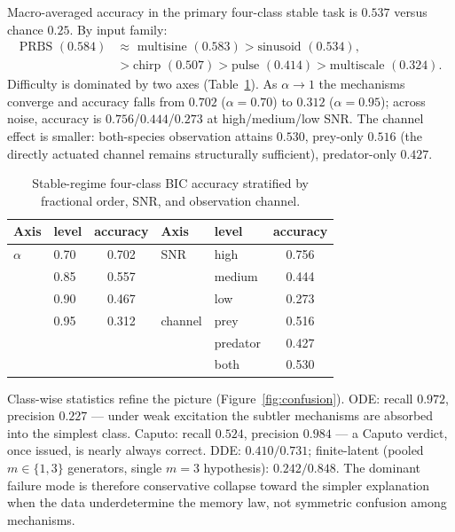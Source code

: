 Macro-averaged accuracy in the primary four-class stable task is $0.537$ versus chance $0.25$. By input family:
\[
\begin{aligned}
\text{PRBS }(0.584)&\approx\text{ multisine }(0.583)>\text{sinusoid }(0.534),\\
&>\text{chirp }(0.507)>\text{pulse }(0.414)>\text{multiscale }(0.324).
\end{aligned}
\]
Difficulty is dominated by two axes (Table~\ref{tab:benchmark-stratified}). As $\alpha\to1$ the mechanisms converge and accuracy falls from $0.702$ ($\alpha=0.70$) to $0.312$ ($\alpha=0.95$); across noise, accuracy is $0.756$/$0.444$/$0.273$ at high/medium/low SNR. The channel effect is smaller: both-species observation attains $0.530$, prey-only $0.516$ (the directly actuated channel remains structurally sufficient), predator-only $0.427$.

\begin{table}[htbp]
\centering
\caption{Stable-regime four-class BIC accuracy stratified by fractional order, SNR, and observation channel.}
\label{tab:benchmark-stratified}
\footnotesize
\setlength{\tabcolsep}{4pt}
\begin{tabular}{llc@{\quad}llc}
\hline
\textbf{Axis} & \textbf{level} & \textbf{accuracy} & \textbf{Axis} & \textbf{level} & \textbf{accuracy}\\
\hline
$\alpha$ & 0.70 & 0.702 & SNR & high & 0.756\\
          & 0.85 & 0.557 &     & medium & 0.444\\
          & 0.90 & 0.467 &     & low & 0.273\\
          & 0.95 & 0.312 & channel & prey & 0.516\\
          &      &       &         & predator & 0.427\\
          &      &       &         & both & 0.530\\
\hline
\end{tabular}
\end{table}

Class-wise statistics refine the picture (Figure~\ref{fig:confusion}). ODE: recall $0.972$, precision $0.227$ --- under weak excitation the subtler mechanisms are absorbed into the simplest class. Caputo: recall $0.524$, precision $0.984$ --- a Caputo verdict, once issued, is nearly always correct. DDE: $0.410/0.731$; finite-latent (pooled $m\in\{1,3\}$ generators, single $m=3$ hypothesis): $0.242/0.848$. The dominant failure mode is therefore conservative collapse toward the simpler explanation when the data underdetermine the memory law, not symmetric confusion among mechanisms.

